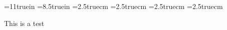 
\paperheight=11truein
\paperwidth=8.5truein
\leftmargin=2.5truecm
\rightmargin=2.5truecm
\topmargin=2.5truecm
\bottommargin=2.5truecm

This is a test

\bye
